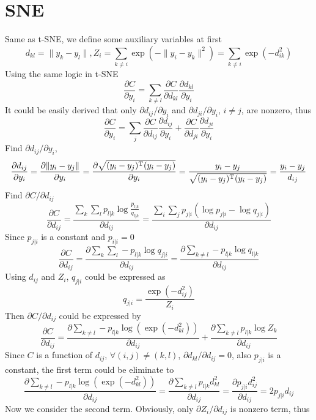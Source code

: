 \documentclass[11pt]{article}
\begin{document}
\section{SNE}
Same as t-SNE, we define some auxiliary variables at first
\cite{maaten2008visualizing}
$$
    d_{kl} = \|y_k - y_l\|, Z_{i} = \sum_{k\neq i} \exp (-\|y_i - y_k\|^2) = 
    \sum_{k\neq i}\exp (-d_{ik}^2)
$$
Using the same logic in t-SNE
$$
\frac{\partial{C}}{\partial{y_i}} = \sum_{k\neq l} \frac{\partial{C}}{\partial{d_{kl}}}
\frac{\partial{d_{kl}}}{\partial{y_i}}
$$
It could be easily derived that only $\partial d_{ij}/\partial y_i$ and $\partial d_{ji}/\partial y_i$, $i\neq j$, 
are nonzero, thus
$$
\frac{\partial{C}}{\partial{y_i}} = \sum_j \frac{\partial{C}}{\partial{d_{ij}}}
\frac{\partial{d_{ij}}}{\partial{y_i}} +\frac{\partial{C}}{\partial{d_{ji}}}
\frac{\partial{d_{ji}}}{\partial{y_i}}
$$
Find $\partial{d_{ij}}/\partial{y_i}$, 
$$
\frac{\partial{d_{ij}}}{\partial{y_i}} = \frac{\partial{\|y_i - y_j\|}}{\partial{y_i}} = 
\frac{\partial\sqrt{(y_i-y_j)^{\rm T}(y_i-y_j)}}{\partial{y_i}} = \frac{y_i-y_j}
{\sqrt{(y_i-y_j)^{\rm T}(y_i-y_j)}} = \frac{y_i-y_j}{d_{ij}}
$$
Find $\partial C/\partial d_{ij}$
$$
\frac{\partial C}{\partial d_{ij}} = \frac{\sum_k \sum_l p_{l|k} \log\frac{p_{l|k}}{q_{l|k}}}
{\partial d_{ij}} = \frac{\sum_i\sum_j p_{j|i}(\log p_{j|i} - \log q_{j|i})}{\partial d_{ij}}
$$
Since $p_{j|i}$ is a constant and $p_{i|i}=0$
$$
\frac{\partial C}{\partial d_{ij}} = \frac{\partial{\sum_k\sum_l -p_{l|k}\log q_{j|i}}}{\partial d_{ij}} = 
\frac{\partial\sum_{k\neq l}-p_{l|k}\log q_{l|k}}{\partial d_{ij}}
$$
Using $d_{ij}$ and $Z_i$, $q_{j|i}$ could be expressed as
$$
    q_{j|i} = \frac{\exp(-d_{ij}^2)}{Z_i}
$$
Then $\partial C/\partial d_{ij}$ could be expressed by
$$
\frac{\partial C}{\partial d_{ij}} = \frac{\partial \sum_{k\neq l}-p_{l|k}\log(\exp (-d_{kl}^2))}{\partial d_{ij}} + 
\frac{\partial \sum_{k\neq l} p_{l|k}\log Z_k}{\partial d_{ij}}
$$
Since $C$ is a function of $d_{ij}$, $\forall (i, j)\neq (k, l)$, $\partial d_{kl}/\partial d_{ij}=0$, 
also $p_{j|i}$ is a constant, the first term could be eliminate to 
$$
\frac{\partial \sum_{k\neq l}-p_{l|k}\log(\exp (-d_{kl}^2))}{\partial d_{ij}} = 
\frac{\partial \sum_{k\neq l}p_{l|k}d_{kl}^2}{\partial d_{ij}}=
\frac{\partial p_{j|i}d_{ij}^2}{\partial d_{ij}} = 2p_{j|i}d_{ij}
$$
Now we consider the second term. Obviously, only $\partial Z_i/\partial d_{ij}$ is nonzero term, thus
\end{document}
